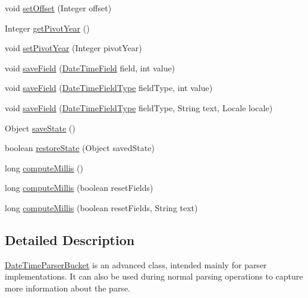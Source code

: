 \begin{DoxyCompactItemize}
\item 
void \hyperlink{classorg_1_1joda_1_1time_1_1format_1_1_date_time_parser_bucket_a1545997e1d63d2f72367414f01077c99}{set\-Offset} (Integer offset)
\item 
Integer \hyperlink{classorg_1_1joda_1_1time_1_1format_1_1_date_time_parser_bucket_a366868970a45c18ac89142dc613e857e}{get\-Pivot\-Year} ()
\item 
void \hyperlink{classorg_1_1joda_1_1time_1_1format_1_1_date_time_parser_bucket_a40772409403b924160681f03c9d79941}{set\-Pivot\-Year} (Integer pivot\-Year)
\item 
void \hyperlink{classorg_1_1joda_1_1time_1_1format_1_1_date_time_parser_bucket_a9c76f4919f7a4fe183c93aea671a0c86}{save\-Field} (\hyperlink{classorg_1_1joda_1_1time_1_1_date_time_field}{Date\-Time\-Field} field, int value)
\item 
void \hyperlink{classorg_1_1joda_1_1time_1_1format_1_1_date_time_parser_bucket_a141cc9c0f68ba2c15371c377e875b196}{save\-Field} (\hyperlink{classorg_1_1joda_1_1time_1_1_date_time_field_type}{Date\-Time\-Field\-Type} field\-Type, int value)
\item 
void \hyperlink{classorg_1_1joda_1_1time_1_1format_1_1_date_time_parser_bucket_ac0f8f87c6afdc0cb64d040a7fcd1158d}{save\-Field} (\hyperlink{classorg_1_1joda_1_1time_1_1_date_time_field_type}{Date\-Time\-Field\-Type} field\-Type, String text, Locale locale)
\item 
Object \hyperlink{classorg_1_1joda_1_1time_1_1format_1_1_date_time_parser_bucket_a3f15e085f48bab28d9554520aada4e19}{save\-State} ()
\item 
boolean \hyperlink{classorg_1_1joda_1_1time_1_1format_1_1_date_time_parser_bucket_a8458628e3ec13ba39397d36d74df4522}{restore\-State} (Object saved\-State)
\item 
long \hyperlink{classorg_1_1joda_1_1time_1_1format_1_1_date_time_parser_bucket_a696991216247b11729a7426daad46db1}{compute\-Millis} ()
\item 
long \hyperlink{classorg_1_1joda_1_1time_1_1format_1_1_date_time_parser_bucket_a6acfcf7e27e8f5fe9795c35a9bb0744e}{compute\-Millis} (boolean reset\-Fields)
\item 
long \hyperlink{classorg_1_1joda_1_1time_1_1format_1_1_date_time_parser_bucket_ace3f7ca50cda3b90a635cb19bc5c75ae}{compute\-Millis} (boolean reset\-Fields, String text)
\end{DoxyCompactItemize}


\subsection{Detailed Description}
\hyperlink{classorg_1_1joda_1_1time_1_1format_1_1_date_time_parser_bucket}{Date\-Time\-Parser\-Bucket} is an advanced class, intended mainly for parser implementations. It can also be used during normal parsing operations to capture more information about the parse. 

